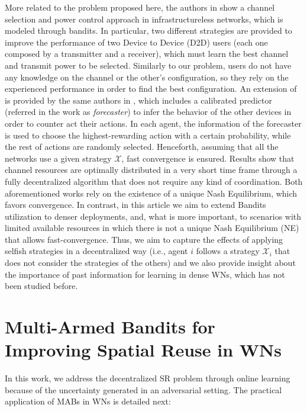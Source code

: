 \documentclass{article}
\begin{document}
	More related to the problem proposed here, the authors in \cite{maghsudi2015joint} show a channel selection and power control approach in infrastructureless networks, which is modeled through bandits. In particular, two different strategies are provided to improve the performance of two Device to Device (D2D) users (each one composed by a transmitter and a receiver), which must learn the best channel and transmit power to be selected. Similarly to our problem, users do not have any knowledge on the channel or the other's configuration, so they rely on the experienced performance in order to find the best configuration. An extension of \cite{maghsudi2015joint} is provided by the same authors in \cite{maghsudi2015channel}, which includes a calibrated predictor (referred in the work as \textit{forecaster}) to infer the behavior of the other devices in order to counter act their actions. In each agent, the information of the forecaster is used to choose the highest-rewarding action with a certain probability, while the rest of actions are randomly selected. Henceforth, assuming that all the networks use a given strategy $\mathcal{X}$, fast convergence is ensured. Results show that channel resources are optimally distributed in a very short time frame through a fully decentralized algorithm that does not require any kind of coordination. Both aforementioned works rely on the existence of a unique Nash Equilibrium, which favors convergence. In contrast, in this article we aim to extend Bandits utilization to denser deployments, and, what is more important, to scenarios with limited available resources in which there is not a unique Nash Equilibrium (NE) that allows fast-convergence. Thus, we aim to capture the effects of applying selfish strategies in a decentralized way (i.e., agent $i$ follows a strategy $\mathcal{X}_i$ that does not consider the strategies of the others) and we also provide insight about the importance of past information for learning in dense WNs, which has not been studied before.
	
	\section{Multi-Armed Bandits for Improving Spatial Reuse in WNs}
	\label{section:mabs}
	
	In this work, we address the decentralized SR problem through online learning because of the uncertainty generated in an adversarial setting. The practical application of MABs in WNs is detailed next:
	
\end{document}
